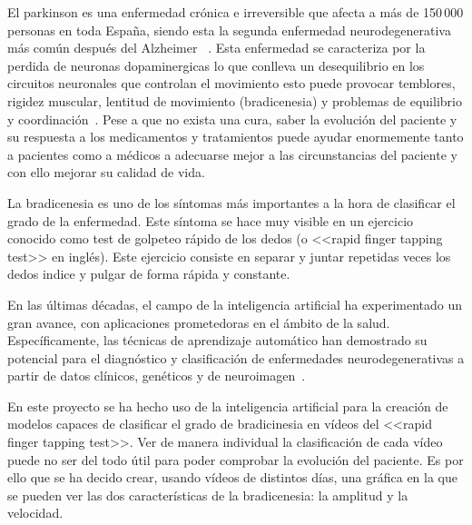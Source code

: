 
El parkinson es una enfermedad crónica e irreversible que afecta a más de 150\,000 personas en toda España, siendo esta la segunda enfermedad neurodegenerativa más común después del Alzheimer ~\cite{brainsci11081027}. Esta enfermedad se caracteriza por la perdida de neuronas dopaminergicas lo que conlleva un desequilibrio en los circuitos neuronales que controlan el movimiento esto puede provocar temblores, rigidez muscular, lentitud de movimiento (bradicenesia) y problemas de equilibrio y coordinación~\cite{Poewe_Seppi_Tanner_Halliday_Brundin_Volkmann_Schrag_Lang_2017}.
Pese a que no exista una cura, saber la evolución del paciente y su respuesta a los medicamentos y tratamientos puede ayudar enormemente tanto a pacientes como a médicos a adecuarse mejor a las circunstancias del paciente y con ello mejorar su calidad de vida.
 
La bradicenesia es uno de los síntomas más importantes a la hora de clasificar el grado de la enfermedad. Este síntoma se hace muy visible en un ejercicio conocido como test de golpeteo rápido de los dedos (o <<rapid finger tapping test>> en inglés). Este ejercicio consiste en separar y juntar repetidas veces los dedos indice y pulgar de forma rápida y constante.

En las últimas décadas, el campo de la inteligencia artificial ha experimentado un gran avance, con aplicaciones prometedoras en el ámbito de la salud. Específicamente, las técnicas de aprendizaje automático han demostrado su potencial para el diagnóstico y clasificación de enfermedades neurodegenerativas a partir de datos clínicos, genéticos y de neuroimagen~\cite{CardiacCare}.

En este proyecto se ha hecho uso de la inteligencia artificial para la creación de modelos capaces de clasificar el grado de bradicinesia en vídeos del <<rapid finger tapping test>>. Ver de manera individual la clasificación de cada vídeo puede no ser del todo útil para poder comprobar la evolución del paciente. Es por ello que se ha decido crear, usando vídeos de distintos días, una gráfica en la que se pueden ver las dos características de la bradicenesia: la amplitud y la velocidad. 